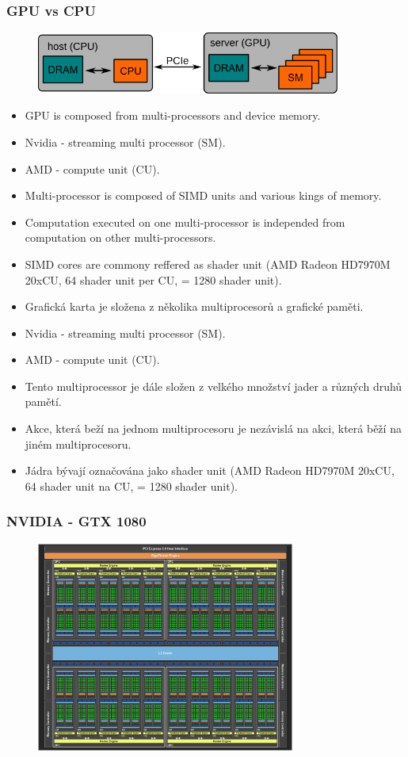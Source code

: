 \begin{frame}
\frametitle{GPU vs CPU}
	\begin{figure}[h]
	\includegraphics[width=10cm,keepaspectratio]{pics/gpu/gpu_common}
	\end{figure}
  \scriptsize

	\begin{itemize}
	\item GPU is composed from multi-processors and device memory.
  \item Nvidia - streaming multi processor (SM).
  \item AMD   - compute unit (CU).
  \item Multi-processor is composed of SIMD units and various kings of memory.
  \item Computation executed on one multi-processor is independed from computation on other multi-processors.
  \item SIMD cores are commony reffered as shader unit (AMD Radeon HD7970M 20xCU, 64 shader unit per CU, = 1280 shader unit).
	\end{itemize}

	\begin{itemize}
	\item Grafická karta je složena z několika multiprocesorů a grafické paměti.
  \item Nvidia - streaming multi processor (SM).
  \item AMD   - compute unit (CU).
  \item Tento multiprocessor je dále složen z velkého množství jader a různých druhů pamětí.
  \item Akce, která beží na jednom multiprocesoru je nezávislá na akci, která běží na jiném multiprocesoru.
  \item Jádra bývají označována jako shader unit (AMD Radeon HD7970M 20xCU, 64 shader unit na CU, = 1280 shader unit).
	\end{itemize}
\end{frame}

\begin{frame}
\frametitle{NVIDIA - GTX 1080}
	\begin{figure}[h]
	\includegraphics[width=8.5cm,keepaspectratio]{pics/gpu/1080}
	\end{figure}
\end{frame}


